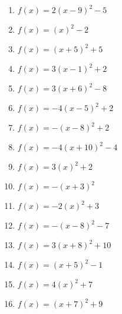 \documentclass{article}%
\begin{document}
\begin{enumerate}[label=\alph*)]
\item%
\newline\vspace{0.5cm} $f(x)=2(x-9)^2 -5$%
\item%
\newline\vspace{0.5cm} $f(x)=(x)^2 -2$%
\item%
\newline\vspace{0.5cm} $f(x)=(x+5)^2 +5$%
\item%
\newline\vspace{0.5cm} $f(x)=3(x-1)^2 +2$%
\item%
\newline\vspace{0.5cm} $f(x)=3(x+6)^2 -8$%
\item%
\newline\vspace{0.5cm} $f(x)=-4(x-5)^2 +2$%
\item%
\newline\vspace{0.5cm} $f(x)=-(x-8)^2 +2$%
\item%
\newline\vspace{0.5cm} $f(x)=-4(x+10)^2 -4$%
\item%
\newline\vspace{0.5cm} $f(x)=3(x)^2 +2$%
\item%
\newline\vspace{0.5cm} $f(x)=-(x+3)^2$%
\item%
\newline\vspace{0.5cm} $f(x)=-2(x)^2 +3$%
\item%
\newline\vspace{0.5cm} $f(x)=-(x-8)^2 -7$%
\item%
\newline\vspace{0.5cm} $f(x)=3(x+8)^2 +10$%
\item%
\newline\vspace{0.5cm} $f(x)=(x+5)^2 -1$%
\item%
\newline\vspace{0.5cm} $f(x)=4(x)^2 +7$%
\item%
\newline\vspace{0.5cm} $f(x)=(x+7)^2 +9$%

\end{enumerate}
\end{document}
